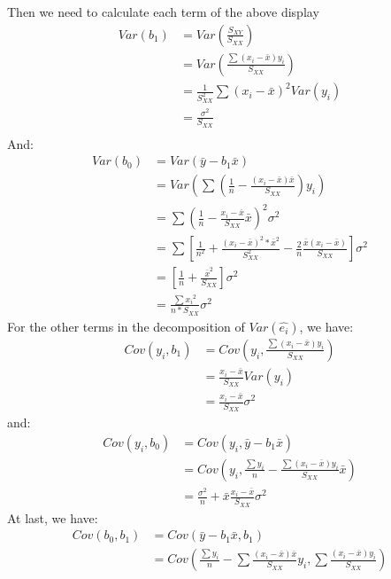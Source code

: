 \documentclass[12pt]{article}
\begin{document}
{Then we need to calculate each term of the above display
\begin{align*}
 Var(b_1)&=Var(\frac{S_{XY}}{S_{XX}})\\
             &=Var(\frac{\sum{(x_i-\bar{x})}y_i}{S_{XX}})\\
             &=\frac{1}{S_{XX}^2}\sum(x_i-\bar{x})^2Var(y_i)\\
             &=\frac{\sigma^2}{S_{XX}}\\
\end{align*}
And:\\
\begin{align*}
 Var(b_0)&=Var(\bar{y}-b_1\bar{x})\\
             &=Var(\sum{(\frac{1}{n}-\frac{(x_i-\bar{x})\bar{x}}{S_{XX}})y_i})\\
             &=\sum{(\frac{1}{n}-\frac{x_i-\bar{x}}{S_{XX}}\bar{x})^2}\sigma^2\\
             &=\sum{[\frac{1}{n^2}+\frac{(x_i-\bar{x})^2*\bar{x}^2}{S_{XX}^2}-\frac{2}{n}\frac{\bar{x}(x_i-\bar{x})}{S_{XX}}]}\sigma^2\\
             &=[\frac{1}{n}+\frac{\bar{x}^2}{S_{XX}}]\sigma^2\\
             &=\frac{\sum{x_i}^2}{n*S_{XX}}\sigma^2
\end{align*}
For the other terms in the decomposition of $Var(\hat{e_i})$, we
have:\\
\begin{align*}
 Cov(y_i,b_1)&=Cov(y_i,\frac{\sum(x_i-\bar{x})y_i}{S_{XX}})\\
                       &=\frac{x_i-\bar{x}}{S_{XX}}Var(y_i)\\
                       &=\frac{x_i-\bar{x}}{S_{XX}}\sigma^2
\end{align*}
and:\\
\begin{align*}
 Cov(y_i,b_0)&=Cov(y_i,\bar{y}-b_1\bar{x})\\
                       &=Cov(y_i,\frac{\sum{y_i}}{n}-\frac{\sum{(x_i-\bar{x})y_i}}{S_{XX}}\bar{x})\\
                       &=\frac{\sigma^2}{n}+\bar{x}\frac{x_i-\bar{x}}{S_{XX}}\sigma^2
\end{align*}
At last, we have:\\
\begin{align*}
 Cov(b_0,b_1)&=Cov(\bar{y}-b_1\bar{x},b_1)\\
                                 &=Cov(\frac{\sum{y_i}}{n}-\sum{\frac{(x_i-\bar{x})\bar{x}}{S_{XX}}}y_i,\sum{\frac{(x_i-\bar{x})y_i}{S_{XX}}})\\

\end{align*}}
\end{document}
